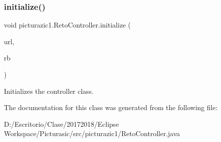 \subsubsection{\texorpdfstring{initialize()}{initialize()}}
{\footnotesize\ttfamily void picturazic1.\+Reto\+Controller.\+initialize (\begin{DoxyParamCaption}\item[{U\+RL}]{url,  }\item[{Resource\+Bundle}]{rb }\end{DoxyParamCaption})}

Initializes the controller class. 

The documentation for this class was generated from the following file\+:\begin{DoxyCompactItemize}
\item 
D\+:/\+Escritorio/\+Clase/20172018/\+Eclipse Workspace/\+Picturasic/src/picturazic1/Reto\+Controller.\+java\end{DoxyCompactItemize}
